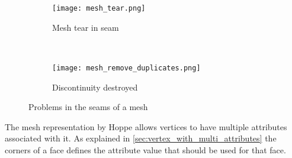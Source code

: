 \begin{figure}[ht]
  \centering
  \begin{subfigure}[b]{.45\textwidth} 
    \texttt{[image: mesh\_tear.png]}
    \caption{Mesh tear in seam}
    \label{fig:mesh_tear}
  \end{subfigure}
  ~
  \begin{subfigure}[b]{.45\textwidth}
    \texttt{[image: mesh\_remove\_duplicates.png]}
    \caption{Discontinuity destroyed}
    \label{fig:mesh_discontinuity}
  \end{subfigure}
  \caption{Problems in the seams of a mesh}
  \label{fig:mesh_seam_problems}
\end{figure}

The mesh representation by Hoppe \cite{hoppe1998efficient} allows vertices to have multiple attributes associated with it. As explained in \cref{sec:vertex_with_multi_attributes} the corners of a face defines the attribute value that should be used for that face.

